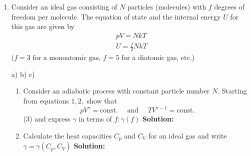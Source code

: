 \documentclass[10pt]{article}
\newenvironment{Solution}
    {\textbf{Solution:}
    
    \vspace{5mm}
    \begin{tcolorbox}
    }
    {
    \end{tcolorbox}
    \vspace{5mm}
    }
\begin{document}
\begin{enumerate}
\begin{enumerate}
    \begin{Solution}


    \end{Solution}
    \item Show that $A$ has to be in fact be independent of $x,$ that is, $\mathrm{d} A / \mathrm{d} x=0$ and hence $A=A_{0}$
    
    \begin{Solution}


    \end{Solution}
    \item Derive an expression for $S(T, x)$ assuming $S(T=0, x=0)=S_{0}$
    
    \begin{Solution}


    \end{Solution}
    \item Calculate the heat capacity at constant tension, that is,
$$
C_{\tau}=T\left(\frac{\partial S}{\partial T}\right)_{\tau}
$$
as a function of $T$ and $\tau$
    
    \begin{Solution}


    \end{Solution}

\end{enumerate}
\newpage

\item Consider an ideal gas consisting of $N$ particles (molecules) with $f$ degrees of freedom per molecule. The equation of state and the internal energy $U$ for this gas are given by
$$
\begin{array}{l}
p V=N k T \\
U=\frac{f}{2} N k T
\end{array}
$$
$(f=3 \text { for a monoatomic gas, } f=5$ for a diatomic gas, etc.)


a) 
b) 
c) 
\begin{enumerate}
\item Consider an adiabatic process with constant particle number $N$. Starting from equations $1,2,$ show that
$$
p V^{\gamma}=\text {const.} \quad \text { and } \quad T V^{\gamma-1}=\text {const.}
$$
(3)
and express $\gamma$ in terms of $f: \gamma(f)$
\begin{Solution}


\end{Solution}

\item Calculate the heat capacities $C_{p}$ and $C_{V}$ for an ideal gas and write $\gamma=\gamma\left(C_{p}, C_{V}\right)$
\begin{Solution}


\end{Solution}
\end{enumerate}
\end{enumerate}
\end{document}
